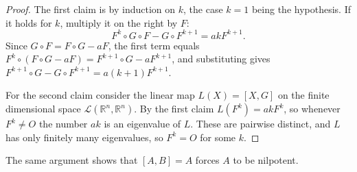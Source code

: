 \documentclass[12pt]{article}
\theoremstyle{breakplain}
\theoremstyle{breakdef}
\theoremstyle{remark}
\begin{document}
\begin{proof}
    The first claim is by induction on $k$, the case $k=1$ being the hypothesis. If it holds for $k$, multiply it on the right by $F$:
    \[F^k\circ G \circ F- G\circ F^{k+1}=akF^{k+1}.\]
    Since $G\circ F=F\circ G-aF$, the first term equals $F^k\circ(F\circ G-aF)=F^{k+1}\circ G-aF^{k+1}$, and substituting gives $F^{k+1}\circ G-G\circ F^{k+1}=a(k+1)F^{k+1}$.

    For the second claim consider the linear map $L(X)=[X,G]$ on the finite dimensional space $\mathcal{L}(\mathbb{R}^n,\mathbb{R}^n)$. By the first claim $L(F^k)=akF^k$, so whenever $F^k\neq O$ the number $ak$ is an eigenvalue of $L$. These are pairwise distinct, and $L$ has only finitely many eigenvalues, so $F^k=O$ for some $k$.
\end{proof}
The same argument shows that $[A,B]=A$ forces $A$ to be nilpotent.
\end{document}
